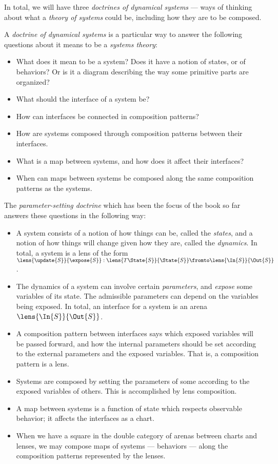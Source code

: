 \documentclass[DynamicalBook]{subfiles}
\begin{document}
In total, we will have three \emph{doctrines of dynamical systems} --- ways of thinking about what a \emph{theory of systems} could be, including how they are to be composed.

\begin{informal}\label{informal:paradigm}
 A \emph{doctrine of dynamical systems} is a particular way to answer the following questions about it means to be a \emph{systems theory}:
 \begin{itemize}
   \item What does it mean to be a system? Does it have a notion of states, or of behaviors? Or is it a diagram describing the way some primitive parts are organized?
   \item What should the interface of a system be?
   \item How can interfaces be connected in composition patterns?
  \item How are systems composed through composition patterns between their interfaces.
  \item What is a map between systems, and how does it affect their interfaces?
  \item When can maps between systems be composed along the same composition patterns as the systems.
  \end{itemize}
  \end{informal}

The \emph{parameter-setting doctrine} which has been the focus of the book so far answers these questions in the following way:
\begin{itemize}
  \item A system consists of a notion of how things can be, called the \emph{states}, and a notion of how things will change given how they are, called the \emph{dynamics}. In total, a system is a lens of the form $\lens{\update{S}}{\expose{S}} : \lens{T\State{S}}{\State{S}} \fromto \lens{\In{S}}{\Out{S}}$.
  \item The dynamics of a system can involve certain \emph{parameters}, and \emph{expose} some variables of its state. The admissible parameters can depend on the variables being exposed. In total, an interface for a system is an arena $\lens{\In{S}}{\Out{S}}$.
  \item A composition pattern between interfaces says which exposed variables will be passed forward, and how the internal parameters should be set according to the external parameters and the exposed variables. That is, a composition pattern is a lens.
\item Systems are composed by setting the parameters of some according to the exposed variables of others. This is accomplished by lens composition.
  \item A map between systems is a function of state which respects observable behavior; it affects the interfaces as a chart.
  \item When we have a square in the double category of arenas between charts and lenses, we may compose maps of systems --- behaviors --- along the composition patterns represented by the lenses.
\end{itemize}
\end{document}
